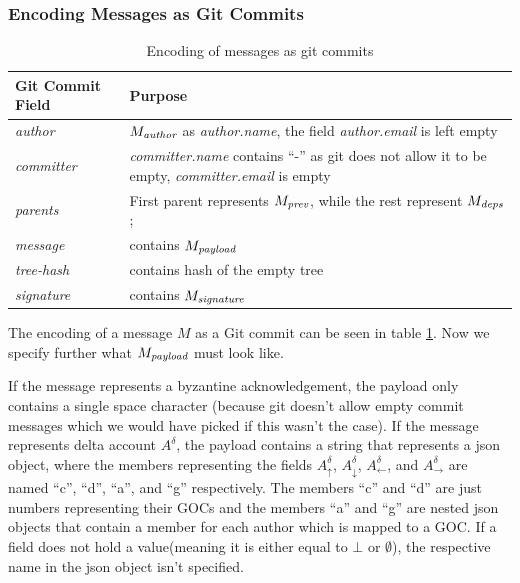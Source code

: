 \documentclass{article}
\begin{document}
\subsubsection{Encoding Messages as Git Commits}
\label{sec:payload-syntax}
\begin{table}
\begin{tabular}{|l|p{7cm}|}
\hline
\textbf{Git Commit Field} & \textbf{Purpose} \\
\hline
\emph{author} & $M_\emph{author}$ as \emph{author.name}, the field \emph{author.email} is left empty \\
\emph{committer} & \emph{committer.name} contains ``-'' as git does not allow it to be empty, \emph{committer.email} is empty \\
\emph{parents} & First parent represents $M_\emph{prev}$, while the rest represent $M_\emph{deps}$; \\
\emph{message} & contains $M_\emph{payload}$\\
\emph{tree-hash} & contains hash of the empty tree \\
\emph{signature} & contains $M_\emph{signature}$ \\
\hline
\end{tabular}
\caption{Encoding of messages as git commits}
\label{tab:msg-encoded-as-commit}
\end{table}

The encoding of a message $M$ as a Git commit can be seen in table \ref{tab:msg-encoded-as-commit}. Now we specify further what $M_\emph{payload}$ must look like.

If the message represents a byzantine acknowledgement, the payload only contains a single space character (because git doesn't allow empty commit messages which we would have picked if this wasn't the case).
If the message represents delta account $A^\delta$, the payload contains a string that represents a json object, where the members representing the fields $A^\delta_\uparrow$, $A^\delta_\downarrow$, $A^\delta_\leftarrow$, and $A^\delta_\rightarrow$ are named ``c'', ``d'', ``a'', and ``g'' respectively. The members ``c'' and ``d'' are just numbers representing their GOCs and the members ``a'' and ``g'' are nested json objects that contain a member for each author which is mapped to a GOC. If a field does not hold a value(meaning it is either equal to $\bot$ or $\emptyset$), the respective name in the json object isn't specified. 
\end{document}
